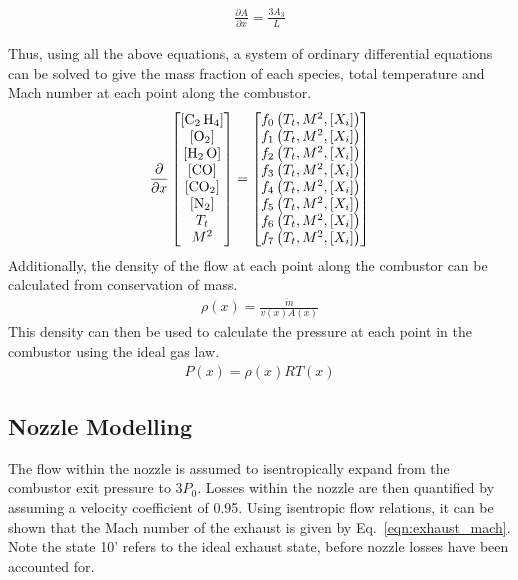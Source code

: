 \documentclass[a4paper]{article}
\begin{document}
\begin{align}
    \frac{\partial A}{\partial x} = \frac{3A_3}{L}
\end{align}

Thus, using all the above equations, a system of ordinary differential equations can be solved to give the mass fraction of each species, total temperature and Mach number at each point along the combustor.
\begin{align}
    \frac{\partial}{\partial x} 
    \begin{bmatrix}
    \left[ \ce{C_2 H_4} \right] \\
    \left[ \ce{O_2} \right] \\
    \left[ \ce{H_2 O} \right] \\
    \left[ \ce{CO} \right] \\
    \left[ \ce{CO_2} \right] \\
    \left[ \ce{N_2} \right] \\
    T_t\\
    M^2
    \end{bmatrix}
    =
    \begin{bmatrix}
        f_0 \left(T_t, M^2, \left[ X_i \right]\right)\\
        f_1 \left(T_t, M^2, \left[ X_i \right]\right)\\
        f_2 \left(T_t, M^2, \left[ X_i \right]\right)\\
        f_3 \left(T_t, M^2, \left[ X_i \right]\right)\\
        f_4 \left(T_t, M^2, \left[ X_i \right]\right)\\
        f_5 \left(T_t, M^2, \left[ X_i \right]\right)\\
        f_6 \left(T_t, M^2, \left[ X_i \right]\right)\\
        f_7 \left(T_t, M^2, \left[ X_i \right]\right)
    \end{bmatrix}
\end{align}
Additionally, the density of the flow at each point along the combustor can be calculated from conservation of mass.
\begin{align}
    \rho(x) = \frac{\dot{m}}{v(x) A(x)}
\end{align}
This density can then be used to calculate the pressure at each point in the combustor using the ideal gas law.
\begin{align}
    P(x) = \rho(x) R T(x)
\end{align}

\subsection{Nozzle Modelling}
The flow within the nozzle is assumed to isentropically expand from the combustor exit pressure to \(3P_0\). Losses within the nozzle are then quantified by assuming a velocity coefficient of 0.95. Using isentropic flow relations, it can be shown that the Mach number of the exhaust is given by Eq.~\ref{eqn:exhaust_mach}. Note the state 10' refers to the ideal exhaust state, before nozzle losses have been accounted for.
\end{document}
